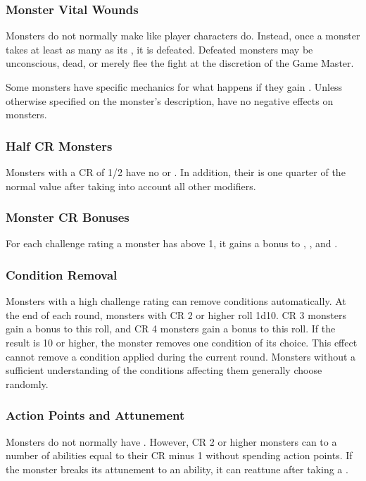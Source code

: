         \subsubsection{Monster Vital Wounds}
            Monsters do not normally make  like player characters do.
            Instead, once a monster takes at least as many  as its , it is defeated.
            Defeated monsters may be unconscious, dead, or merely flee the fight at the discretion of the Game Master.

            Some monsters have specific mechanics for what happens if they gain .
            Unless otherwise specified on the monster's description,  have no negative effects on monsters.

        \subsubsection{Half CR Monsters}\label{Half CR Monsters}
            Monsters with a CR of 1/2 have no  or .
            In addition, their  is one quarter of the normal value after taking into account all other modifiers.

        \subsubsection{Monster CR Bonuses}
            For each challenge rating a monster has above 1, it gains a  bonus to , , and .

        \subsubsection{Condition Removal}
            Monsters with a high challenge rating can remove conditions automatically.
            At the end of each round, monsters with CR 2 or higher roll 1d10.
            CR 3 monsters gain a  bonus to this roll, and CR 4 monsters gain a  bonus to this roll.
            If the result is 10 or higher, the monster removes one condition of its choice.
            This effect cannot remove a condition applied during the current round.
            Monsters without a sufficient understanding of the conditions affecting them generally choose randomly.

        \subsubsection{Action Points and Attunement}
            Monsters do not normally have .
            However, CR 2 or higher monsters can  to a number of abilities equal to their CR minus 1 without spending action points.
            If the monster breaks its attunement to an ability, it can reattune after taking a .

